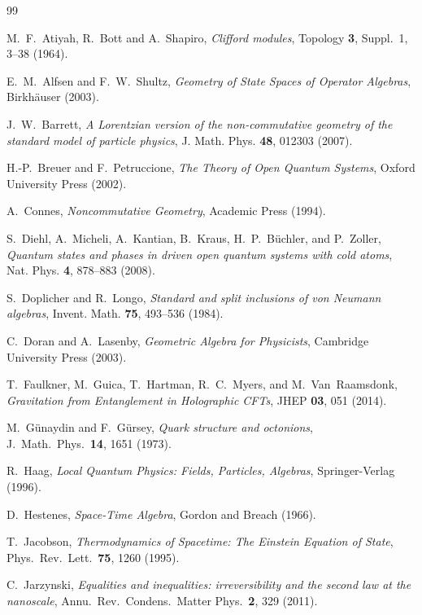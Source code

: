 \documentclass[12pt,a4paper,openany]{book}
\begin{document}
\begin{thebibliography}{99}

M.~F.~Atiyah, R.~Bott and A.~Shapiro,
\emph{Clifford modules},
Topology \textbf{3}, Suppl.~1, 3--38 (1964).

E.~M.~Alfsen and F.~W.~Shultz, \emph{Geometry of State Spaces of Operator Algebras}, Birkh\"auser (2003).

J.~W.~Barrett, \emph{A Lorentzian version of the non-commutative geometry of the standard model of particle physics}, J. Math. Phys. \textbf{48}, 012303 (2007).

H.-P.~Breuer and F.~Petruccione, \emph{The Theory of Open Quantum Systems}, Oxford University Press (2002).

A.~Connes, \emph{Noncommutative Geometry}, Academic Press (1994).

S.~Diehl, A.~Micheli, A.~Kantian, B.~Kraus, H.~P.~B\"uchler, and P.~Zoller, \emph{Quantum states and phases in driven open quantum systems with cold atoms}, Nat. Phys. \textbf{4}, 878--883 (2008).

S.~Doplicher and R.~Longo, \emph{Standard and split inclusions of von Neumann algebras}, Invent. Math. \textbf{75}, 493--536 (1984).

C.~Doran and A.~Lasenby, \emph{Geometric Algebra for Physicists}, Cambridge University Press (2003).

T.~Faulkner, M.~Guica, T.~Hartman, R.~C.~Myers, and M.~Van~Raamsdonk, \emph{Gravitation from Entanglement in Holographic CFTs}, JHEP \textbf{03}, 051 (2014).

M.~G\"unaydin and F.~G\"ursey, \emph{Quark structure and octonions}, J.\ Math.\ Phys.\ \textbf{14}, 1651 (1973).

R.~Haag, \emph{Local Quantum Physics: Fields, Particles, Algebras}, Springer-Verlag (1996).

D.~Hestenes, \emph{Space-Time Algebra}, Gordon and Breach (1966).

T.~Jacobson, \emph{Thermodynamics of Spacetime: The Einstein Equation of State}, Phys.\ Rev.\ Lett.\ \textbf{75}, 1260 (1995).

C.~Jarzynski, \emph{Equalities and inequalities: irreversibility and the second law at the nanoscale}, Annu.\ Rev.\ Condens.\ Matter Phys.\ \textbf{2}, 329 (2011).


\end{thebibliography}
\end{document}
